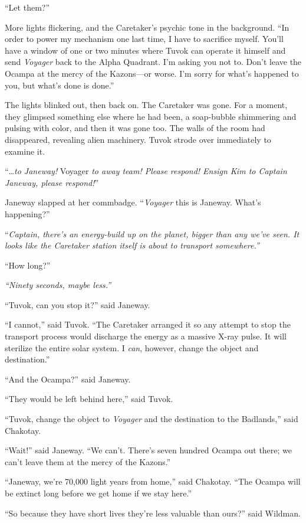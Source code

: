 \documentclass[twoside,letterpaper,12pt]{memoir}
\begin{document}
``Let them?'' 

More lights flickering, and the Caretaker’s psychic tone in the background. ``In order to power my mechanism one last time, I have to sacrifice myself. You’ll have a window of one or two minutes where Tuvok can operate it himself and send \textit{Voyager} back to the Alpha Quadrant. I’m asking you not to. Don’t leave the Ocampa at the mercy of the Kazons---or worse. I’m sorry for what’s happened to you, but what’s done is done.'' 

The lights blinked out, then back on. The Caretaker was gone. For a moment, they glimpsed something else where he had been, a soap-bubble shimmering and pulsing with color, and then it was gone too. The walls of the room had disappeared, revealing alien machinery. Tuvok strode over immediately to examine it. 

``\ldots \textit{to Janeway! }Voyager \textit{to away team! Please respond! Ensign Kim to Captain Janeway, please respond!}'' 

Janeway slapped at her commbadge. ``\textit{Voyager }this is Janeway. What’s happening?'' 

``\textit{Captain, there’s an energy-build up on the planet, bigger than any we’ve seen. It looks like the Caretaker station itself is about to transport somewhere.''} 

``How long?'' 

\textit{``Ninety seconds, maybe less.''} 

``Tuvok, can you stop it?'' said Janeway. 

``I cannot,'' said Tuvok. ``The Caretaker arranged it so any attempt to stop the transport process would discharge the energy as a massive X-ray pulse. It will sterilize the entire solar system. I \textit{can}, however, change the object and destination.'' 

``And the Ocampa?'' said Janeway. 

``They would be left behind here,'' said Tuvok. 

``Tuvok, change the object to \textit{Voyager} and the destination to the Badlands,'' said Chakotay. 

``Wait!'' said Janeway. ``We can’t. There’s seven hundred Ocampa out there; we can’t leave them at the mercy of the Kazons.'' 

``Janeway, we’re 70,000 light years from home,'' said Chakotay. ``The Ocampa will be extinct long before we get home if we stay here.'' 

``So because they have short lives they’re less valuable than ours?'' said Wildman. 
\end{document}
